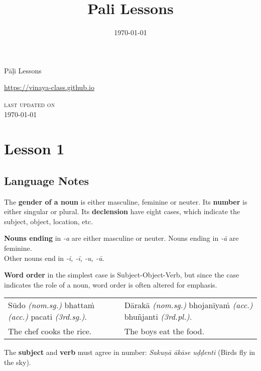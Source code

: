 \documentclass[11pt,oneside]{memoir}
\date{\today}
\title{Pali Lessons}
\def\maketitle{}
\begin{document}
\maketitle
\frontmatter
\par
{\centering
\par
{\Huge Pāḷi Lessons}
\par
\bigskip
\href{https://vinaya-class.github.io}{https://vinaya-class.github.io}
\par
{\scshape\small last updated on}\\
\today
\par
}
\par
\bigskip
\tableofcontents*
\par
\mainmatter

\chapter{Lesson 1}
\label{sec:org26c7094}
\section{Language Notes}
\label{sec:org001f9a8}

The \textbf{gender of a noun} is either masculine, feminine or neuter.
Its \textbf{number} is either singular or plural.
Its \textbf{declension} have eight cases, which indicate the subject, object, location, etc.

\textbf{Nouns ending} in \emph{-a} are either masculine or neuter. Nouns ending in \emph{-ā} are feminine.\\[0pt]
Other nouns end in \emph{-i, -ī, -u, -ū}.

\textbf{Word order} in the simplest case is Subject-Object-Verb, but since the case indicates the role of a noun, word order is often altered for emphasis.

\begin{center}
\begin{tabular}{ll}
Sūdo \emph{(nom.sg.)} bhattaṁ \emph{(acc.)} pacati \emph{(3rd.sg.)}. & Dārakā \emph{(nom.sg.)} bhojanīyaṁ \emph{(acc.)} bhuñjanti \emph{(3rd.pl.)}.\\[0pt]
The chef cooks the rice. & The boys eat the food.\\[0pt]
\end{tabular}
\end{center}

The \textbf{subject} and \textbf{verb} must agree in number: \emph{Sakuṇā ākāse uḍḍenti} (Birds fly in the sky).
\end{document}
